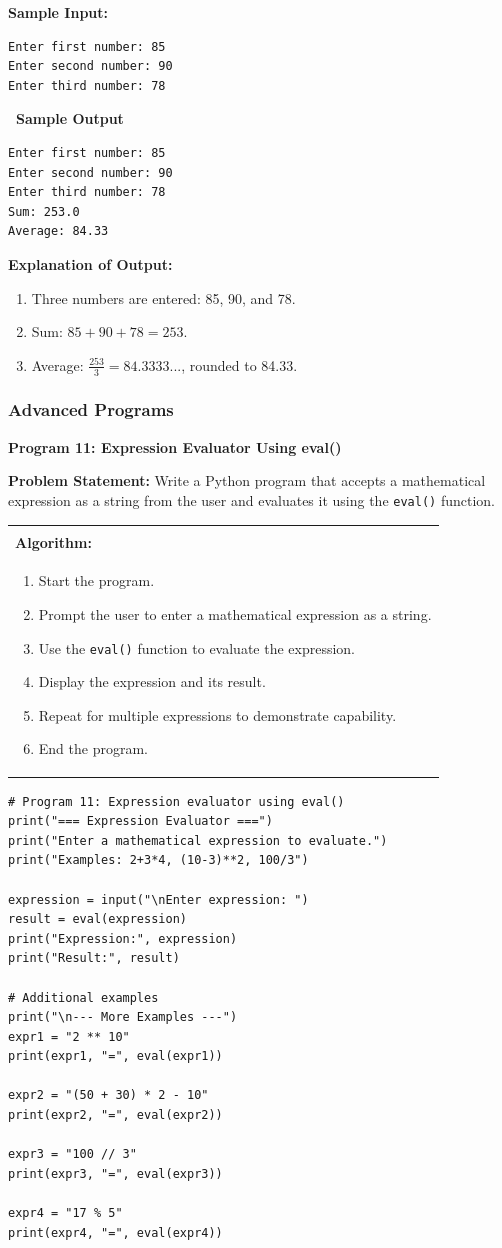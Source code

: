 \documentclass[12pt,a4paper]{article}
\makeatletter
\newcommand{\outhead}{\noindent\colorbox{cmrgreen!25}%
  {\textbf{\small\color{cmrdark}~Sample Output~}}\par\vspace{-1pt}}
\newenvironment{algobox}{%
  \par\vspace{4pt}%
  \noindent\begin{tabular}{@{}p{\linewidth}@{}}%
  \hline\\[-8pt]%
  \textbf{\color{blue!60!black}\small Algorithm:}\\[2pt]%
}{%
  \\[-4pt]\hline%
  \end{tabular}\par\vspace{4pt}%
}
\makeatother
\begin{document}
\textbf{Sample Input:}
\begin{verbatim}
Enter first number: 85
Enter second number: 90
Enter third number: 78
\end{verbatim}

\outhead
\begin{lstlisting}[style=outputstyle]
Enter first number: 85
Enter second number: 90
Enter third number: 78
Sum: 253.0
Average: 84.33
\end{lstlisting}

\textbf{Explanation of Output:}
\begin{enumerate}
  \item Three numbers are entered: 85, 90, and 78.
  \item Sum: $85 + 90 + 78 = 253$.
  \item Average: $\frac{253}{3} = 84.3333...$, rounded to 84.33.
\end{enumerate}

\subsubsection{Advanced Programs}

\textbf{Program 11: Expression Evaluator Using eval()}

\textbf{Problem Statement:}
Write a Python program that accepts a mathematical expression as a string from the user and evaluates it using the \texttt{eval()} function.

\begin{algobox}
\begin{enumerate}[label=Step \arabic*:]
  \item Start the program.
  \item Prompt the user to enter a mathematical expression as a string.
  \item Use the \texttt{eval()} function to evaluate the expression.
  \item Display the expression and its result.
  \item Repeat for multiple expressions to demonstrate capability.
  \item End the program.
\end{enumerate}
\end{algobox}

\begin{lstlisting}
# Program 11: Expression evaluator using eval()
print("=== Expression Evaluator ===")
print("Enter a mathematical expression to evaluate.")
print("Examples: 2+3*4, (10-3)**2, 100/3")

expression = input("\nEnter expression: ")
result = eval(expression)
print("Expression:", expression)
print("Result:", result)

# Additional examples
print("\n--- More Examples ---")
expr1 = "2 ** 10"
print(expr1, "=", eval(expr1))

expr2 = "(50 + 30) * 2 - 10"
print(expr2, "=", eval(expr2))

expr3 = "100 // 3"
print(expr3, "=", eval(expr3))

expr4 = "17 % 5"
print(expr4, "=", eval(expr4))
\end{lstlisting}
\end{document}
